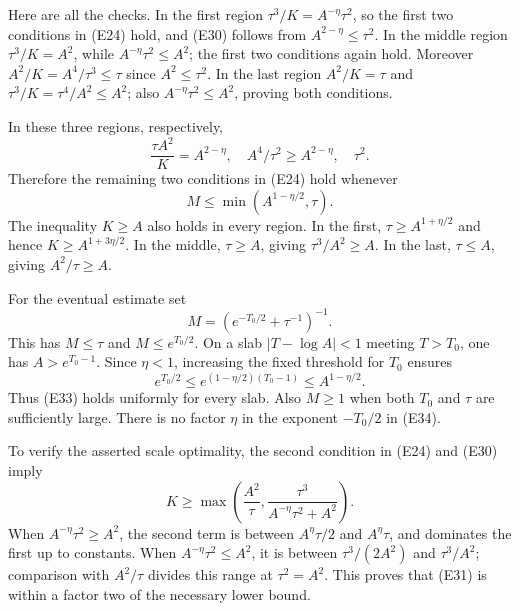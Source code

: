 \documentclass[
  11pt,
]{article}
\makeatletter
\let\ReaderOriginalAnchorStart\hyper@anchorstart
\let\ReaderOriginalAnchorEnd\hyper@anchorend
\let\ReaderPendingAliases\@empty
\def\ReaderArmAliases#1{\gdef\ReaderPendingAliases{#1}}
\def\hyper@anchorstart#1{\ReaderIfNativeAnchorTF{#1}{\ReaderPendingAliases\global\let\ReaderPendingAliases\@empty}{}\ReaderOriginalAnchorStart{#1}}
\makeatother
\begin{document}
Here are all the checks. In the first region
\(\tau^3/K=A^{-\eta}\tau^2\), so the first two conditions in (E24) hold,
and (E30) follows from \(A^{2-\eta}\leq\tau^2\). In the middle region
\(\tau^3/K=A^2\), while \(A^{-\eta}\tau^2\leq A^2\); the first two
conditions again hold. Moreover \(A^2/K=A^4/\tau^3\leq\tau\) since
\(A^2\leq\tau^2\). In the last region \(A^2/K=\tau\) and
\(\tau^3/K=\tau^4/A^2\leq A^2\); also \(A^{-\eta}\tau^2\leq A^2\),
proving both conditions.

In these three regions, respectively, \[
             \frac{\tau A^2}{K}
           =A^{2-\eta},\quad A^4/\tau^2\geq A^{2-\eta},
                       \quad\tau^2.                            \tag{E32}
\] Therefore the remaining two conditions in (E24) hold whenever \[
                         M\leq\min(A^{1-\eta/2},\tau).           \tag{E33}
\] The inequality \(K\geq A\) also holds in every region. In the first,
\(\tau\geq A^{1+\eta/2}\) and hence \(K\geq A^{1+3\eta/2}\). In the
middle, \(\tau\geq A\), giving \(\tau^3/A^2\geq A\). In the last,
\(\tau\leq A\), giving \(A^2/\tau\geq A\).

For the eventual estimate set \[
                      M=\left(e^{-T_0/2}+\tau^{-1}\right)^{-1}.
                                                                    \tag{E34}
\] This has \(M\leq\tau\) and \(M\leq e^{T_0/2}\). On a slab
\(|T-\log A|<1\) meeting \(T>T_0\), one has \(A>e^{T_0-1}\). Since
\(\eta<1\), increasing the fixed threshold for \(T_0\) ensures \[
 e^{T_0/2}\leq e^{(1-\eta/2)(T_0-1)}\leq A^{1-\eta/2}.
\] Thus (E33) holds uniformly for every slab. Also \(M\geq1\) when both
\(T_0\) and \(\tau\) are sufficiently large. There is no factor \(\eta\)
in the exponent \(-T_0/2\) in (E34).

To verify the asserted scale optimality, the second condition in (E24)
and (E30) imply \[
 K\geq\max\left(\frac{A^2}{\tau},
          \frac{\tau^3}{A^{-\eta}\tau^2+A^2}\right).              \tag{E35}
\] When \(A^{-\eta}\tau^2\geq A^2\), the second term is between
\(A^\eta\tau/2\) and \(A^\eta\tau\), and dominates the first up to
constants. When \(A^{-\eta}\tau^2\leq A^2\), it is between
\(\tau^3/(2A^2)\) and \(\tau^3/A^2\); comparison with \(A^2/\tau\)
divides this range at \(\tau^2=A^2\). This proves that (E31) is within a
factor two of the necessary lower bound.

\ReaderArmAliases{\ReaderOriginalAnchorStart{AN03-EXU-006}\ReaderOriginalAnchorEnd\begingroup\expandafter\def\csname @currentHref\endcsname{AN03-EXU-006}\label{AN03-EXU-006}\endgroup\ReaderOriginalAnchorStart{an03-exu-006-derivative-recovery-in-one-chart-and-one-slab}\ReaderOriginalAnchorEnd\begingroup\expandafter\def\csname @currentHref\endcsname{an03-exu-006-derivative-recovery-in-one-chart-and-one-slab}\label{an03-exu-006-derivative-recovery-in-one-chart-and-one-slab}\endgroup\ReaderOriginalAnchorStart{6-derivative-recovery-in-one-chart-and-one-slab}\ReaderOriginalAnchorEnd\begingroup\expandafter\def\csname @currentHref\endcsname{6-derivative-recovery-in-one-chart-and-one-slab}\label{6-derivative-recovery-in-one-chart-and-one-slab}\endgroup\ReaderOriginalAnchorStart{derivative-recovery-in-one-chart-and-one-slab}\ReaderOriginalAnchorEnd}
\end{document}
